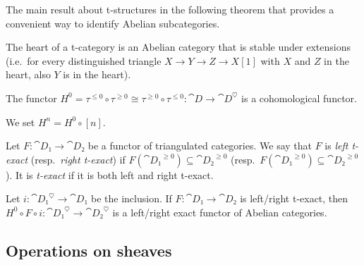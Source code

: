 \documentclass[english]{short-notes}
\begin{document}
The main result about t-structures in the following theorem that provides a convenient way to identify Abelian subcategories.

\begin{Thm}
    The heart of a t-category is an Abelian category that is stable under extensions (i.e.\ for every distinguished triangle $X → Y → Z → X[1]$ with $X$ and $Z$ in the heart, also $Y$ is in the heart).
\end{Thm}

\begin{Prop}
    The functor $H^0 = τ^{≤0} ∘ τ^{≥0} \cong τ^{≥0} ∘ τ^{≤0}\colon \cat D → \cat D^{\heartsuit}$ is a cohomological functor.
\end{Prop}

We set $H^n = H^0 ∘ [n]$.

\begin{Def}
    Let $F\colon \cat{D₁} → \cat{D₂}$ be a functor of triangulated categories.
    We say that $F$ is \emph{left t-exact} (resp.\ \emph{right t-exact}) if $F(\cat{D₁}^{≥0}) ⊆ \cat{D₂}^{≥0}$ (resp.\ $F(\cat{D₁}^{≥0}) ⊆ \cat{D₂}^{≥0}$).
    It is \emph{t-exact} if it is both left and right t-exact.
\end{Def}

\begin{Prop}
    Let $i\colon \cat{D₁}^\heartsuit → \cat{D₁}$ be the inclusion.
    If $F\colon \cat{D₁} → \cat{D₂}$ is left/right t-exact, then $H^0 ∘ F ∘ i\colon \cat{D₁}^\heartsuit → \cat{D₂}^\heartsuit$ is a left/right exact functor of Abelian categories.
\end{Prop}


\subsection{Operations on sheaves}
\end{document}
